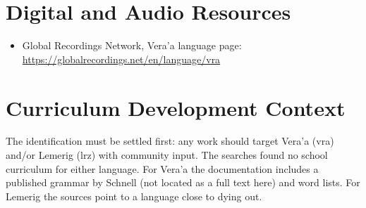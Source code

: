 \documentclass[12pt]{article}
\begin{document}
\section{Digital and Audio Resources}
\begin{itemize}
\item Global Recordings Network, Vera'a language page: \url{https://globalrecordings.net/en/language/vra}
\end{itemize}

\section{Curriculum Development Context}
The identification must be settled first: any work should target Vera'a (vra) and/or Lemerig (lrz) with community input. The searches found no school curriculum for either language. For Vera'a the documentation includes a published grammar by Schnell (not located as a full text here) and word lists. For Lemerig the sources point to a language close to dying out.
\end{document}
